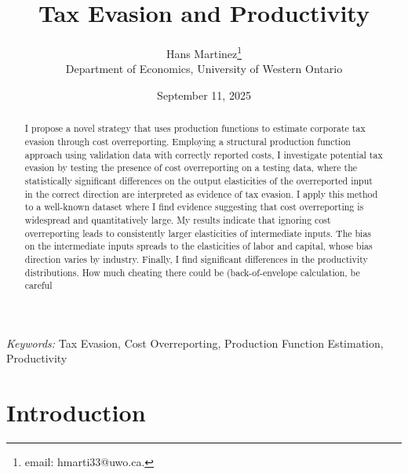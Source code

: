 \documentclass[
  12pt]{article}
\renewcommand*\contentsname{Table of contents}
\newcommand\contentsname{Table of contents}
\theoremstyle{definition}
\theoremstyle{remark}
\begin{document}
\def\spacingset#1{\renewcommand{\baselinestretch}%
{#1}\small\normalsize} \spacingset{1}



\date{September 11, 2025}
\title{\bf Tax Evasion and Productivity}
\author{
Hans Martinez\thanks{email: hmarti33@uwo.ca.}\\
Department of Economics, University of Western Ontario\\
}
\maketitle

\bigskip
\bigskip
\begin{abstract}
I propose a novel strategy that uses production functions to estimate
corporate tax evasion through cost overreporting. Employing a structural
production function approach using validation data with correctly
reported costs, I investigate potential tax evasion by testing the
presence of cost overreporting on a testing data, where the
statistically significant differences on the output elasticities of the
overreported input in the correct direction are interpreted as evidence
of tax evasion. I apply this method to a well-known dataset where I find
evidence suggesting that cost overreporting is widespread and
quantitatively large. My results indicate that ignoring cost
overreporting leads to consistently larger elasticities of intermediate
inputs. The bias on the intermediate inputs spreads to the elasticities
of labor and capital, whose bias direction varies by industry. Finally,
I find significant differences in the productivity distributions. How
much cheating there could be (back-of-envelope calculation, be careful
\end{abstract}

\noindent%
{\it Keywords:} Tax Evasion, Cost Overreporting, Production Function
Estimation, Productivity
\vfill

\newpage
\spacingset{1.9} %

\renewcommand*\contentsname{Table of contents}
{
\hypersetup{linkcolor=}
\setcounter{tocdepth}{3}
\tableofcontents
}
\section*{Introduction}\label{introduction}
\end{document}
